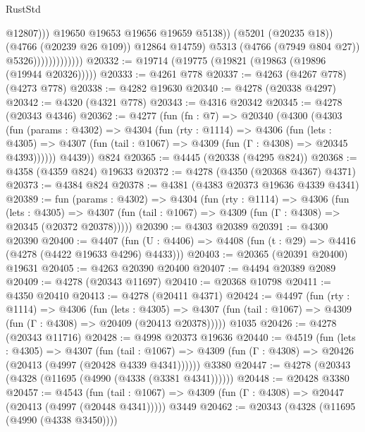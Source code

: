 \begin{lexlean}{RustStd}
\begin{coremodule}
                                          @12807)))
                                    @19650
                                    @19653
                                    @19656
                                    @19659
                                    @5138))
                                (@5201 (@20235 @18))
                                (@4766 (@20239 @26 @109))
                                @12864
                                @14759)
                              @5313
                              (@4766 (@7949 @804 @27))
                              @5326)))))))))))))
@20332 := @19714 (@19775 (@19821 (@19863 (@19896 (@19944 @20326)))))
@20333 := @4261 @778
@20337 := @4263 (@4267 @778) (@4273 @778)
@20338 := @4282 @19630
@20340 := @4278 (@20338 @4297)
@20342 := @4320 (@4321 @778)
@20343 := @4316 @20342
@20345 := @4278 (@20343 @4346)
@20362 := @4277
    (fun (fn : @7) =>
    @20340
      (@4300
        (@4303
          (fun (params : @4302) =>
          @4304
            (fun (rty : @1114) =>
            @4306
              (fun (lets : @4305) =>
              @4307 (fun (tail : @1067) => @4309 (fun (Γ : @4308) => @20345 @4393))))))
        @4439))
    @824
@20365 := @4445 (@20338 (@4295 @824))
@20368 := @4358 (@4359 @824) @19633
@20372 := @4278 (@4350 (@20368 @4367) @4371)
@20373 := @4384 @824
@20378 := @4381 (@4383 @20373 @19636 @4339 @4341)
@20389 := fun (params : @4302) =>
  @4304
    (fun (rty : @1114) =>
    @4306
      (fun (lets : @4305) =>
      @4307 (fun (tail : @1067) => @4309 (fun (Γ : @4308) => @20345 (@20372 @20378)))))
@20390 := @4303 @20389
@20391 := @4300 @20390
@20400 := @4407
    (fun (U : @4406) => @4408 (fun (t : @29) => @4416 (@4278 (@4422 @19633 @4296) @4433)))
@20403 := @20365 (@20391 @20400) @19631
@20405 := @4263 @20390 @20400
@20407 := @4494 @20389 @2089
@20409 := @4278 (@20343 @11697)
@20410 := @20368 @10798
@20411 := @4350 @20410
@20413 := @4278 (@20411 @4371)
@20424 := @4497
    (fun (rty : @1114) =>
    @4306
      (fun (lets : @4305) =>
      @4307 (fun (tail : @1067) => @4309 (fun (Γ : @4308) => @20409 (@20413 @20378)))))
    @1035
@20426 := @4278 (@20343 @11716)
@20428 := @4998 @20373 @19636
@20440 := @4519
    (fun (lets : @4305) =>
    @4307
      (fun (tail : @1067) =>
      @4309 (fun (Γ : @4308) => @20426 (@20413 (@4997 (@20428 @4339 @4341))))))
    @3380
@20447 := @4278 (@20343 (@4328 (@11695 (@4990 (@4338 (@3381 @4341))))))
@20448 := @20428 @3380
@20457 := @4543
    (fun (tail : @1067) => @4309 (fun (Γ : @4308) => @20447 (@20413 (@4997 (@20448 @4341)))))
    @3449
@20462 := @20343 (@4328 (@11695 (@4990 (@4338 @3450))))

\end{coremodule}
\end{lexlean}
